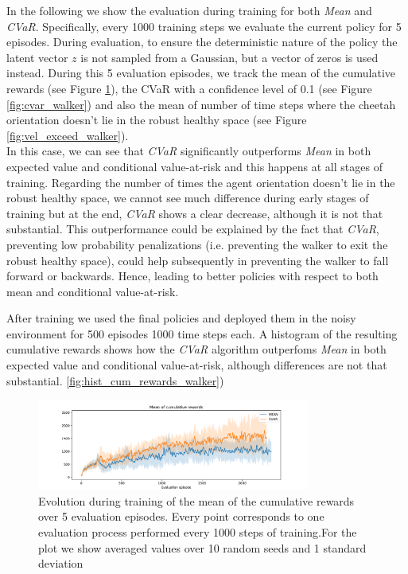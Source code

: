 In the following we show the evaluation during training for both \textit{Mean} and
\textit{CVaR}.
Specifically, every 1000 training steps we evaluate the current policy for 5 episodes.
During evaluation, to ensure the deterministic nature of the policy
the latent vector $z$ is not sampled from a Gaussian, but a vector of zeros is used instead.
During this 5 evaluation episodes, we track the mean of the cumulative rewards (see Figure \ref{fig:mean_walker}),
the CVaR with a confidence level of 0.1 (see Figure \ref{fig:cvar_walker}) and also the 
mean of number of time steps where the cheetah orientation doesn't lie in the robust healthy space (see Figure \ref{fig:vel_exceed_walker}).\\
In this case, we can see that \textit{CVaR} significantly outperforms \textit{Mean} in both expected value and conditional value-at-risk
and this happens at all stages of training.
Regarding the number of times the agent orientation doesn't lie in the robust healthy space,
we cannot see much difference during early stages of training but at the end,
\textit{CVaR} shows a clear decrease, although it is not that substantial.
This outperformance could be explained by the fact that \textit{CVaR}, preventing low probability 
penalizations (i.e. preventing the walker
to exit the
robust healthy space), could help subsequently in preventing the walker to fall forward or backwards.
Hence, leading to better policies with respect to both mean and conditional value-at-risk. 

After training we used the final policies and deployed them in the noisy environment for 500 episodes 
1000 time steps each. A histogram of the resulting cumulative rewards shows
how the \textit{CVaR} algorithm outperfoms \textit{Mean} in both expected value and conditional value-at-risk,
although differences are not that substantial. \ref{fig:hist_cum_rewards_walker})


\begin{figure}[ht]
    \centering
    \includegraphics[width=0.8\textwidth]{images/Walker_offpolicy_expert/mean_train_withstds.pdf}
    \caption{Evolution during training of the mean of the cumulative rewards over 5 evaluation episodes.
    Every point corresponds
    to one evaluation process performed every 1000 steps of training.For the plot we
    show averaged values over 10 random seeds and 1 standard deviation}
    \label{fig:mean_walker}
    
    \end{figure}

